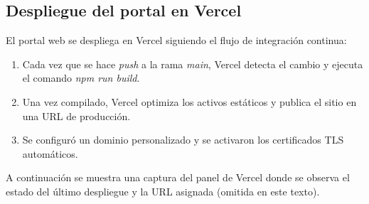 \subsection{Despliegue del portal en Vercel}

\begin{large}
	
El portal web se despliega en Vercel siguiendo el flujo de integración continua:

\begin{enumerate}
  \item Cada vez que se hace \emph{push} a la rama \textit{main}, Vercel detecta el cambio y ejecuta el comando \textit{npm run build}.
  \item Una vez compilado, Vercel optimiza los activos estáticos y publica el sitio en una URL de producción.
  \item Se configuró un dominio personalizado y se activaron los certificados TLS automáticos.
\end{enumerate}

A continuación se muestra una captura del panel de Vercel donde se observa el estado del último despliegue y la URL asignada (omitida en este texto).

\end{large}